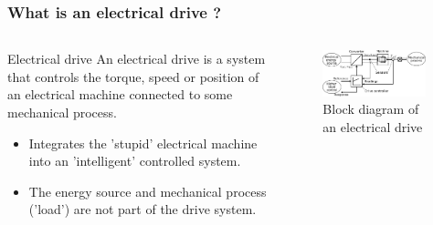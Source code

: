 \begin{frame}
	\frametitle{What is an electrical drive ?}
	\begin{columns}
		\begin{column}{0.4\textwidth}
			\begin{varblock}{Electrical drive}
			   An electrical drive is a system that controls the torque, speed or position of an electrical machine connected to some mechanical process.
			\end{varblock}
			\vspace{0.25cm}
			\begin{itemize}
				\item Integrates the 'stupid' electrical machine into an 'intelligent' controlled system.
				\item The energy source and mechanical process ('load') are not part of the drive system.
			\end{itemize}
		\end{column}
		\begin{column}{0.6\textwidth}
			\begin{figure}
				\centering
				\includegraphics[width=0.95\textwidth]{fig/lec01/Electrical_Drive_Block_Overview.pdf}
				\caption{Block diagram of an electrical drive}
			\end{figure}
		\end{column}
	\end{columns}
\end{frame}

